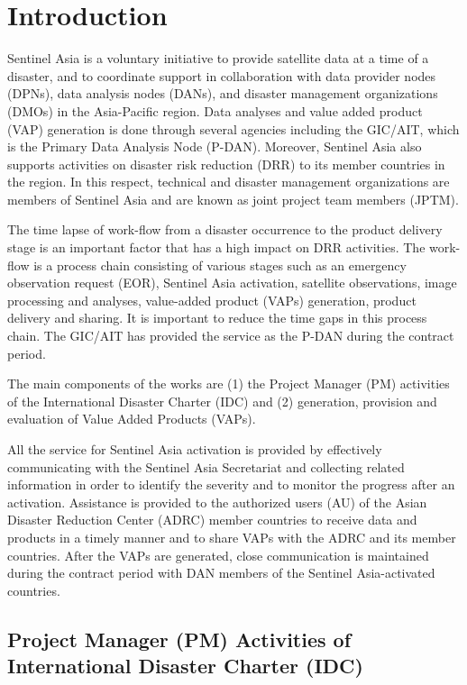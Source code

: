 \documentclass[]{book}
\begin{document}
\chapter{Introduction}\label{intro}

Sentinel Asia is a voluntary initiative to provide satellite data at a
time of a disaster, and to coordinate support in collaboration with data
provider nodes (DPNs), data analysis nodes (DANs), and disaster
management organizations (DMOs) in the Asia-Pacific region. Data
analyses and value added product (VAP) generation is done through
several agencies including the GIC/AIT, which is the Primary Data
Analysis Node (P-DAN). Moreover, Sentinel Asia also supports activities
on disaster risk reduction (DRR) to its member countries in the region.
In this respect, technical and disaster management organizations are
members of Sentinel Asia and are known as joint project team members
(JPTM).

The time lapse of work-flow from a disaster occurrence to the product
delivery stage is an important factor that has a high impact on DRR
activities. The work-flow is a process chain consisting of various
stages such as an emergency observation request (EOR), Sentinel Asia
activation, satellite observations, image processing and analyses,
value-added product (VAPs) generation, product delivery and sharing. It
is important to reduce the time gaps in this process chain. The GIC/AIT
has provided the service as the P-DAN during the contract period.

The main components of the works are (1) the Project Manager (PM)
activities of the International Disaster Charter (IDC) and (2)
generation, provision and evaluation of Value Added Products (VAPs).

All the service for Sentinel Asia activation is provided by effectively
communicating with the Sentinel Asia Secretariat and collecting related
information in order to identify the severity and to monitor the
progress after an activation. Assistance is provided to the authorized
users (AU) of the Asian Disaster Reduction Center (ADRC) member
countries to receive data and products in a timely manner and to share
VAPs with the ADRC and its member countries. After the VAPs are
generated, close communication is maintained during the contract period
with DAN members of the Sentinel Asia-activated countries.

\section{Project Manager (PM) Activities of International Disaster
Charter
(IDC)}\label{project-manager-pm-activities-of-international-disaster-charter-idc}
\end{document}
